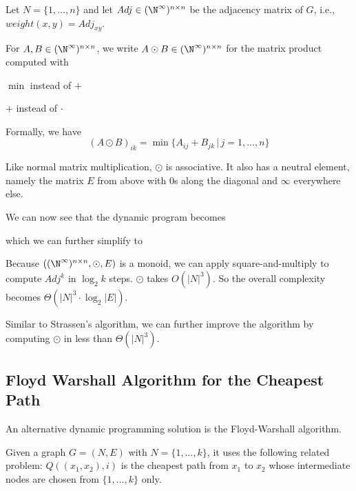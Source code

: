 Let $N=\{1,\ldots,n\}$ and let $Adj\in(\N^\infty)^{n\times n}$ be the adjacency matrix of $G$, i.e., $weight(x,y)=Adj_{xy}$.

For $A,B\in (\N^\infty)^{n\times n}$, we write $A\odot B \in (\N^\infty)^{n\times n}$ for the matrix product computed with
\begin{compactitem}
 \item $\min$ instead of $+$
 \item $+$ instead of $\cdot$
\end{compactitem}
Formally, we have
\[(A\odot B)_{ik}=\min \{A_{ij}+B_{jk}\,|\,j=1,\ldots,n\}\]

Like normal matrix multiplication, $\odot$ is associative.
It also has a neutral element, namely the matrix $E$ from above with $0$s along the diagonal and $\infty$ everywhere else.

We can now see that the dynamic program becomes
\begin{acode}
\end{acode}
which we can further simplify to
\begin{acode}
\end{acode}

Because $((\N^\infty)^{n\times n},\odot,E)$ is a monoid, we can apply square-and-multiply to compute $Adj^k$ in $\log_2 k$ steps.
$\odot$ takes $O(|N|^3)$. So the overall complexity becomes $\Theta(|N|^3\cdot \log_2 |E|)$.

Similar to Strassen's algorithm, we can further improve the algorithm by computing $\odot$ in less than $\Theta(|N|^3)$.

\subsection{Floyd Warshall Algorithm for the Cheapest Path}

An alternative dynamic programming solution is the Floyd-Warshall algorithm.

Given a graph $G=(N,E)$ with $N=\{1,\ldots,k\}$, it uses the following related problem: $Q((x_1,x_2), i)$ is the cheapest path from $x_1$ to $x_2$ whose intermediate nodes are chosen from $\{1,\ldots,k\}$ only.

